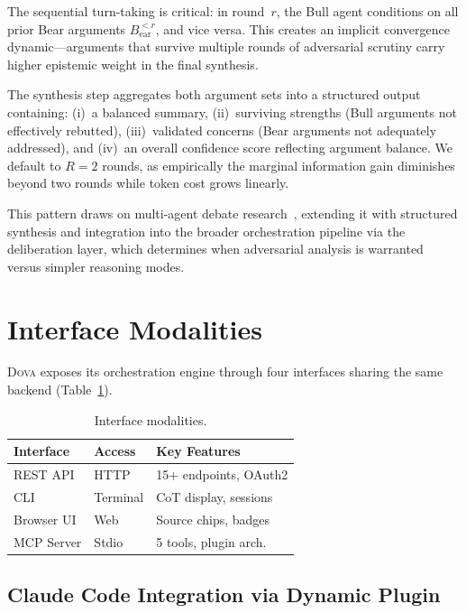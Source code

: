 \documentclass{article}
\theoremstyle{plain}
\theoremstyle{definition}
\newcommand{\dova}{\textsc{Dova}}
\begin{document}
The sequential turn-taking is critical: in round~$r$, the Bull agent conditions
on all prior Bear arguments $B_\mathrm{ear}^{<r}$, and vice versa.  This
creates an implicit convergence dynamic---arguments that survive multiple rounds
of adversarial scrutiny carry higher epistemic weight in the final synthesis.

The synthesis step aggregates both argument sets into a structured output
containing: (i)~a balanced summary, (ii)~surviving strengths (Bull arguments not
effectively rebutted), (iii)~validated concerns (Bear arguments not adequately
addressed), and (iv)~an overall confidence score reflecting argument balance.
We default to $R{=}2$ rounds, as empirically the marginal information gain
diminishes beyond two rounds while token cost grows linearly.

This pattern draws on multi-agent debate
research~\citep{du2023debate,liang2023debate}, extending it with structured
synthesis and integration into the broader orchestration pipeline via the
deliberation layer, which determines when adversarial analysis is warranted
versus simpler reasoning modes.

\section{Interface Modalities}\label{sec:interfaces}

\dova{} exposes its orchestration engine through four interfaces sharing the
same backend (Table~\ref{tab:interfaces}).

\begin{table}[t]
\caption{Interface modalities.}
\label{tab:interfaces}
\centering
\small
\begin{tabular}{@{}lll@{}}
\toprule
\textbf{Interface} & \textbf{Access} & \textbf{Key Features} \\
\midrule
REST API   & HTTP      & 15+ endpoints, OAuth2 \\
CLI        & Terminal  & CoT display, sessions \\
Browser UI & Web       & Source chips, badges \\
MCP Server & Stdio     & 5 tools, plugin arch. \\
\bottomrule
\end{tabular}
\end{table}

\subsection{Claude Code Integration via Dynamic Plugin}\label{sec:claude_code}
\end{document}
